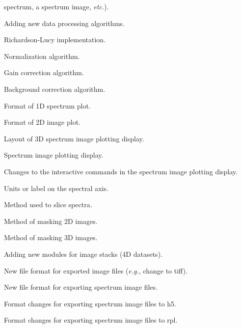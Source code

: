 \documentclass[12pt, titlepage]{article}
\newcounter{acnum}
\newcommand{\actheacnum}{AC\theacnum}
\begin{document}
\begin{description}
    spectrum, a spectrum image, \textit{etc.}).
	\item[\refstepcounter{acnum} \actheacnum \label{acNewDataProcessing}:] Adding
new data processing algorithms.
	\item[\refstepcounter{acnum} \actheacnum \label{acRLoptimize}:] Richardson-Lucy
    implementation.
	\item[\refstepcounter{acnum} \actheacnum \label{acNorm}:] Normalization
    algorithm.  
	\item[\refstepcounter{acnum} \actheacnum \label{acGain}:] Gain
correction algorithm.
	\item[\refstepcounter{acnum} \actheacnum \label{acBkgnd}:] Background
    correction algorithm.
	\item[\refstepcounter{acnum} \actheacnum \label{ac1DplotFormat}:] Format of 1D
spectrum plot.
	\item[\refstepcounter{acnum} \actheacnum \label{ac2DplotFormat}:] Format of 2D
image plot.
	\item[\refstepcounter{acnum} \actheacnum \label{ac3DPlotLayout}:] Layout of 3D
spectrum image plotting display.
	\item[\refstepcounter{acnum} \actheacnum \label{ac3DPlotOptimize}:]
Spectrum image plotting display.
	\item[\refstepcounter{acnum} \actheacnum \label{ac3DPlotCommands}:] Changes to
the interactive commands in the spectrum image plotting display.
	\item[\refstepcounter{acnum} \actheacnum \label{acSpectrumUnits}:] Units or
label on the spectral axis.
	\item[\refstepcounter{acnum} \actheacnum \label{ac1DSlice}:] Method used to
slice spectra.
	\item[\refstepcounter{acnum} \actheacnum \label{ac2DMask}:] Method of masking
2D images.
	\item[\refstepcounter{acnum} \actheacnum \label{ac3DMask}:] Method of masking
3D images.
	\item[\refstepcounter{acnum} \actheacnum \label{ac4Dsupport}:] Adding new
modules for image stacks (4D datasets).
	\item[\refstepcounter{acnum} \actheacnum \label{acImageExportFormat}:] New file
format for exported image files (\textit{e.g.}, change to tiff).
	\item[\refstepcounter{acnum} \actheacnum \label{acSIExportFormat}:] New file
format for exporting spectrum image files.
	\item[\refstepcounter{acnum} \actheacnum \label{acSIExportH5Format}:] Format
changes for exporting spectrum image files to h5.
	\item[\refstepcounter{acnum} \actheacnum \label{acSIExportRPLFormat}:] Format
changes for exporting spectrum image files to rpl.
\end{description}
\end{document}
